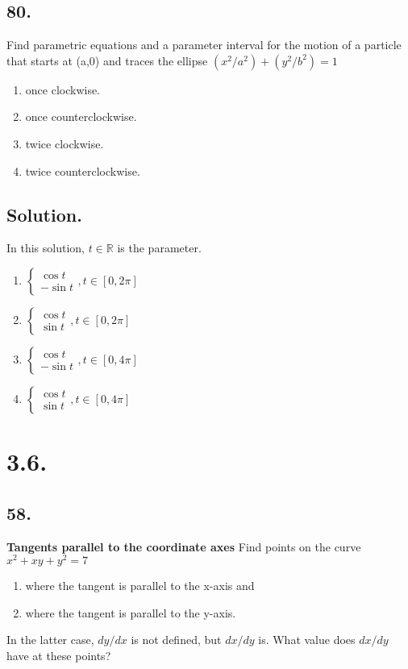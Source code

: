 \documentclass{article}
\begin{document}
\subsection*{80.}
Find parametric equations and a parameter interval for the motion of a particle that starts at (a,0) and traces the ellipse $(x^2/a^2)+(y^2/b^2)=1$
\begin{enumerate} [label=\textbf{\alph*.}]
    \item once clockwise.
    \item once counterclockwise.
    \item twice clockwise.
    \item twice counterclockwise.
\end{enumerate}
\subsection*{Solution.}
In this solution, $t\in \mathbb{R}$ is the parameter.
\begin{enumerate} [label=\textbf{\alph*.}]
    \item $\left\{\begin{array}{l}\cos{t}\\-\sin{t}\end{array}\right.,t\in [0,2\pi]$
    \item $\left\{\begin{array}{l}\cos{t}\\\sin{t}\end{array}\right.,t\in [0,2\pi]$
    \item $\left\{\begin{array}{l}\cos{t}\\-\sin{t}\end{array}\right.,t\in [0,4\pi]$
    \item $\left\{\begin{array}{l}\cos{t}\\\sin{t}\end{array}\right.,t\in [0,4\pi]$
\end{enumerate}
\section*{3.6.}
\subsection*{58.}
\textbf{Tangents parallel to the coordinate axes }  Find points on the curve $x^2+xy+y^2=7$ 
\begin{enumerate} [label=\textbf{\alph*.}]
    \item where the tangent is parallel to the x-axis and
    \item where the tangent is parallel to the y-axis.
\end{enumerate}
In the latter case, $dy/dx$ is not defined, but $dx/dy$ is. What value does $dx/dy$ have at these points?
\end{document}
